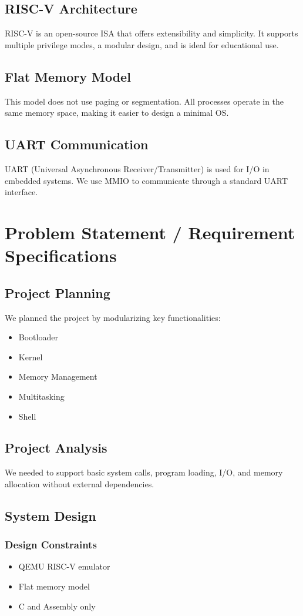 \documentclass[a4paper,12pt]{report}
\begin{document}
\section{RISC-V Architecture}
RISC-V is an open-source ISA that offers extensibility and simplicity. It supports multiple privilege modes, a modular design, and is ideal for educational use.

\section{Flat Memory Model}
This model does not use paging or segmentation. All processes operate in the same memory space, making it easier to design a minimal OS.

\section{UART Communication}
UART (Universal Asynchronous Receiver/Transmitter) is used for I/O in embedded systems. We use MMIO to communicate through a standard UART interface.

\chapter{Problem Statement / Requirement Specifications}
\section{Project Planning}
We planned the project by modularizing key functionalities:
\begin{itemize}
    \item Bootloader
    \item Kernel
    \item Memory Management
    \item Multitasking
    \item Shell
\end{itemize}

\section{Project Analysis}
We needed to support basic system calls, program loading, I/O, and memory allocation without external dependencies.

\section{System Design}
\subsection{Design Constraints}
\begin{itemize}
    \item QEMU RISC-V emulator
    \item Flat memory model
    \item C and Assembly only
\end{itemize}
\end{document}
